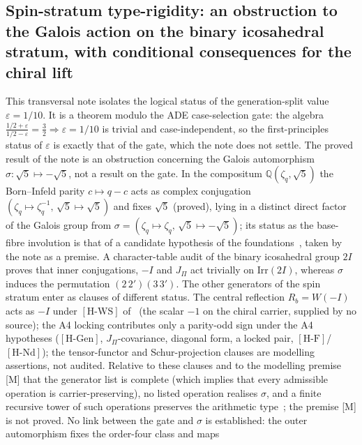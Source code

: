 \documentclass[11pt,a4paper]{article}
\theoremstyle{definition}
\newcommand{\HGen}{\ensuremath{[\mathrm{H\text{-}Gen}]}}
\newcommand{\HWS}{\ensuremath{[\mathrm{H\text{-}WS}]}}
\newcommand{\HNd}{\ensuremath{[\mathrm{H\text{-}Nd}]}}
\newcommand{\HF}{\ensuremath{[\mathrm{H\text{-}F}]}}
\begin{document}
    \subsection{Spin-stratum type-rigidity: an obstruction to the Galois action on the binary icosahedral stratum, with
      conditional consequences for the chiral lift~\cite{Beau2026aog}}
      This transversal note isolates the logical status of the generation-split value $\varepsilon=1/10$.
      It is a theorem modulo the ADE case-selection gate: the algebra
      $\tfrac{1/2+\varepsilon}{1/2-\varepsilon}=\tfrac{3}{2}\Rightarrow\varepsilon=1/10$ is trivial and
      case-independent, so the first-principles status of $\varepsilon$ is exactly that of the gate, which the note does
      not settle.
      The proved result of the note is an obstruction concerning the Galois automorphism
      $\sigma:\sqrt{5}\mapsto-\sqrt{5}$, not a result on the gate.
      In the compositum $\mathbb{Q}(\zeta_q,\sqrt{5})$ the Born--Infeld parity $c\mapsto q-c$ acts as complex conjugation
      $(\zeta_q\mapsto\zeta_q^{-1},\,\sqrt{5}\mapsto\sqrt{5})$ and fixes $\sqrt{5}$ (proved), lying in a distinct
      direct factor of the Galois group from $\sigma=(\zeta_q\mapsto\zeta_q,\,\sqrt{5}\mapsto-\sqrt{5})$; its status
      as the base-fibre involution is that of a candidate hypothesis of the foundations~\cite{Beau2026m}, taken by the note
      as a premise.
      A character-table audit of the binary icosahedral group $2I$ proves that inner conjugations, $-I$ and $J_\Pi$ act
      trivially on $\mathrm{Irr}(2I)$, whereas $\sigma$ induces the permutation $(2\,2')(3\,3')$.
      The other generators of the spin stratum enter as clauses of different status.
      The central reflection $R_b=W(-I)$ acts as $-I$ under \HWS{} of~\cite{Beau2026q11of} (the scalar $-1$ on the
      chiral carrier, supplied by no source); the A4 locking contributes only a parity-odd sign under the A4
      hypotheses (\HGen{}, $J_\Pi$-covariance, diagonal form, a locked pair, \HF{}/\HNd{}); the tensor-functor and
      Schur-projection clauses are modelling assertions, not audited.
      Relative to these clauses and to the modelling premise [M] that the generator list is complete (which implies that
      every admissible operation is carrier-preserving), no listed operation realises $\sigma$, and a finite recursive tower of
      such operations preserves the arithmetic type~\cite{Beau2026aog}; the premise [M] is not proved.
      No link between the gate and $\sigma$ is established: the outer automorphism fixes the order-four class and maps
\end{document}
